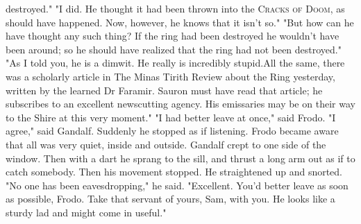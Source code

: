 destroyed."
  "I did. He thought it had been thrown into the \textcolor{RedOrange}{\textsc{\LARGE Cracks of Doom}}, as should
have happened. Now, however, he knows that it isn't so."
  "But how can he have thought any such thing? If the ring had been
destroyed he wouldn't have been around; so he should have realized that the
ring had not been destroyed."
  "As I told you, he is a dimwit. He really is incredibly stupid.All the
same, there was a scholarly article in The Minas Tirith Review about the
Ring yesterday, written by the learned Dr Faramir. Sauron must have read
that article; he subscribes to an excellent newscutting agency. His
emissaries may be on their way to the Shire at this very moment."
  "I had better leave at once," said Frodo.
  "I agree," said Gandalf. Suddenly he stopped as if listening. Frodo became
aware that all was very quiet, inside and outside. Gandalf crept to one
side of the window. Then with a dart he sprang to the sill, and thrust a
long arm out as if to catch somebody. Then his movement stopped. He
straightened up and snorted.
  "No one has been eavesdropping," he said. "Excellent. You'd better leave
as soon as possible, Frodo. Take that servant of yours, Sam, with you. He
looks like a sturdy lad and might come in useful."
